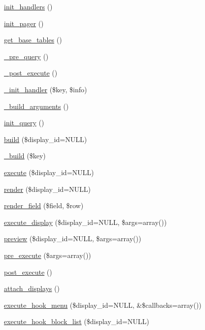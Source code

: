 \begin{DoxyCompactItemize}
\hyperlink{classview_a8f0b3dc5e14f0d96d37af0050b83ee6b}{init\_\-handlers} ()
\item 
\hyperlink{classview_a32d1a24b94fcbb880b18ba8ae8dc709d}{init\_\-pager} ()
\item 
\hyperlink{classview_ae938f5f192743bc0a231e21f60b37383}{get\_\-base\_\-tables} ()
\item 
\hyperlink{classview_a882fc1813823b4fa361748edaae121ee}{\_\-pre\_\-query} ()
\item 
\hyperlink{classview_ad6c1a54c6fe9fc3c32629e575c58ad21}{\_\-post\_\-execute} ()
\item 
\hyperlink{classview_ac63256fe2666c60445bc14aaf7a6e885}{\_\-init\_\-handler} (\$key, \$info)
\item 
\hyperlink{classview_aaca007d4c1a81235098314c3b54e9277}{\_\-build\_\-arguments} ()
\item 
\hyperlink{classview_af71eca2ca74a696efe9be2b7cd6fee8f}{init\_\-query} ()
\item 
\hyperlink{classview_ae6c1bacf2c29c0b2b0f641c4768f2f44}{build} (\$display\_\-id=NULL)
\item 
\hyperlink{classview_a85b835ebd83d4e84bf4fbda3829ce12b}{\_\-build} (\$key)
\item 
\hyperlink{classview_ad33e492cac26ffd816fc9ba9361875d1}{execute} (\$display\_\-id=NULL)
\item 
\hyperlink{classview_ab5ab302afd30f1c6805dc82883a5fdd4}{render} (\$display\_\-id=NULL)
\item 
\hyperlink{classview_a6b91f886cd5ab16151c7ea2e0ba95ad2}{render\_\-field} (\$field, \$row)
\item 
\hyperlink{classview_a6b47b3882f4fea8e53a11c88f147973b}{execute\_\-display} (\$display\_\-id=NULL, \$args=array())
\item 
\hyperlink{classview_ae279461b2f1636e802587901acdf3bd2}{preview} (\$display\_\-id=NULL, \$args=array())
\item 
\hyperlink{classview_ab3b5984d0d4628552580a2703502f840}{pre\_\-execute} (\$args=array())
\item 
\hyperlink{classview_ac541f5588453cd52ce0b5c0e0b3443f4}{post\_\-execute} ()
\item 
\hyperlink{classview_a39447f6a3f0456b0a2e75799c074e453}{attach\_\-displays} ()
\item 
\hyperlink{classview_a2e63acdea758605cdb1ce0a8db979ee2}{execute\_\-hook\_\-menu} (\$display\_\-id=NULL, \&\$callbacks=array())
\item 
\hyperlink{classview_a0eea3903963084753464702a9c399406}{execute\_\-hook\_\-block\_\-list} (\$display\_\-id=NULL)

\end{DoxyCompactItemize}

